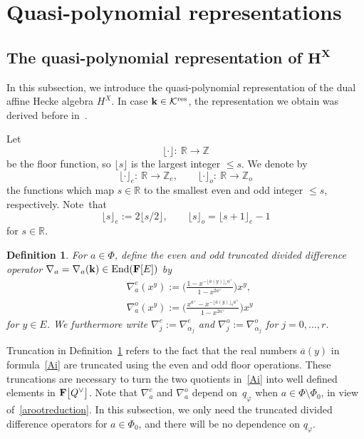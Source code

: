 \documentclass[pdftex]{sigma}
\numberwithin{equation}{section}
\newtheorem{Definition}[Theorem]{Definition}
\begin{document}
\section{Quasi-polynomial representations}\label{qpsect}

\subsection[The quasi-polynomial representation of H\^{}X]{The quasi-polynomial representation of $\boldsymbol{H^X}$}\label{qpHX}

In this subsection, we introduce the quasi-polynomial representation of the dual affine Hecke algebra $H^X$.
In case $\mathbf{k}\in\mathcal{K}^{{\rm res}}$,
the representation we obtain was derived before in~\cite{SSV2, SSV1}.

Let
\[
\lfloor\cdot\rfloor\colon \ \mathbb{R}\rightarrow \mathbb{Z}
\]
be the floor function, so $\lfloor s\rfloor$ is the largest integer $\leq s$. We denote by
\[
\lfloor\cdot\rfloor_e\colon \ \mathbb{R}\rightarrow\mathbb{Z}_e,\qquad
\lfloor\cdot\rfloor_o\colon \ \mathbb{R}\rightarrow\mathbb{Z}_o
\]
the functions which map $s\in\mathbb{R}$ to
the smallest even and odd integer $\leq s$, respectively. Note~that
\[
\lfloor s\rfloor_e:=2\lfloor s/2\rfloor,\qquad
\lfloor s\rfloor_o=\lfloor s+1\rfloor_e-1
\]
for $s\in\mathbb{R}$.

\begin{Definition}\label{truncation}
For $a\in\Phi$, define the even and odd truncated divided difference operator $\nabla_a=\nabla_a(\mathbf{k})\in\textup{End}(\mathbf{F}[E])$ by
\begin{align}
&\nabla_a^e(x^y):=\Biggl(\frac{1-x^{-\lfloor\overline{a}(y)\rfloor_ea^\vee}}{1-x^{2a^\vee}}\Biggr)x^y,\nonumber\\
&\nabla_a^o(x^y):=\Biggl(\frac{x^{a^\vee}-x^{-\lfloor\overline{a}(y)\rfloor_oa^\vee}}{1-x^{2a^\vee}}\Biggr)x^y\label{Ai}
\end{align}
for $y\in E$. We furthermore write $\nabla_j^e:=\nabla_{\alpha_j}^e$ and $\nabla_j^o:=\nabla_{\alpha_j}^o$ for $j=0,\dots,r$.
\end{Definition}

Truncation in Definition~\ref{truncation} refers to the fact that the real numbers $\overline{a}(y)$ in formula~\eqref{Ai} are truncated using the even and odd floor operations.
These truncations are necessary to turn the two quotients in~\eqref{Ai} into well defined elements in $\mathbf{F}\smash{\bigl[Q^\vee\bigr]}$. Note that $\nabla_a^e$ and $\nabla_a^o$ depend on~$q_\varphi$ when $a\in\Phi\setminus\Phi_0$, in view of~\eqref{arootreduction}. In this subsection, we only need the truncated divided difference operators for $a\in\Phi_0$, and there will be no dependence on $q_\varphi$.
\end{document}

